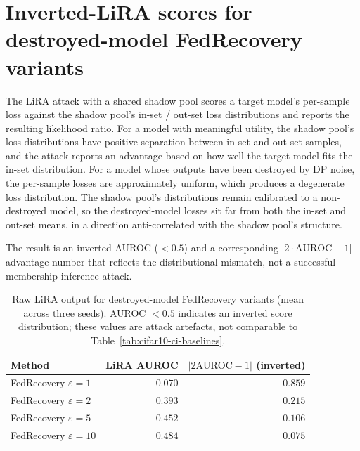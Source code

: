 \section{Inverted-LiRA scores for destroyed-model FedRecovery variants}
\label{app:inverted-lira}

The LiRA attack with a shared shadow pool scores a target model's
per-sample loss against the shadow pool's in-set / out-set loss
distributions and reports the resulting likelihood ratio. For a model
with meaningful utility, the shadow pool's loss distributions have
positive separation between in-set and out-set samples, and the attack
reports an advantage based on how well the target model fits the in-set
distribution. For a model whose outputs have been destroyed by DP noise,
the per-sample losses are approximately uniform, which produces a
degenerate loss distribution. The shadow pool's distributions remain
calibrated to a non-destroyed model, so the destroyed-model losses sit
far from both the in-set and out-set means, in a direction
anti-correlated with the shadow pool's structure.

The result is an inverted AUROC ($<\!0.5$) and a corresponding
$|2 \cdot \mathrm{AUROC} - 1|$ advantage number that reflects the
distributional mismatch, not a successful membership-inference attack.

\begin{table}[h]
\centering
\small
\begin{tabular}{lrr}
\toprule
Method & LiRA AUROC & $|2\mathrm{AUROC}-1|$ (inverted) \\
\midrule
FedRecovery $\varepsilon = 1$     & $0.070$ & $0.859$ \\
FedRecovery $\varepsilon = 2$     & $0.393$ & $0.215$ \\
FedRecovery $\varepsilon = 5$     & $0.452$ & $0.106$ \\
FedRecovery $\varepsilon = 10$    & $0.484$ & $0.075$ \\
\bottomrule
\end{tabular}
\caption{Raw LiRA output for destroyed-model FedRecovery variants (mean across three seeds). AUROC $<0.5$ indicates an inverted score distribution; these values are attack artefacts, not comparable to Table~\ref{tab:cifar10-ci-baselines}.}
\label{tab:inverted-lira}
\end{table}
